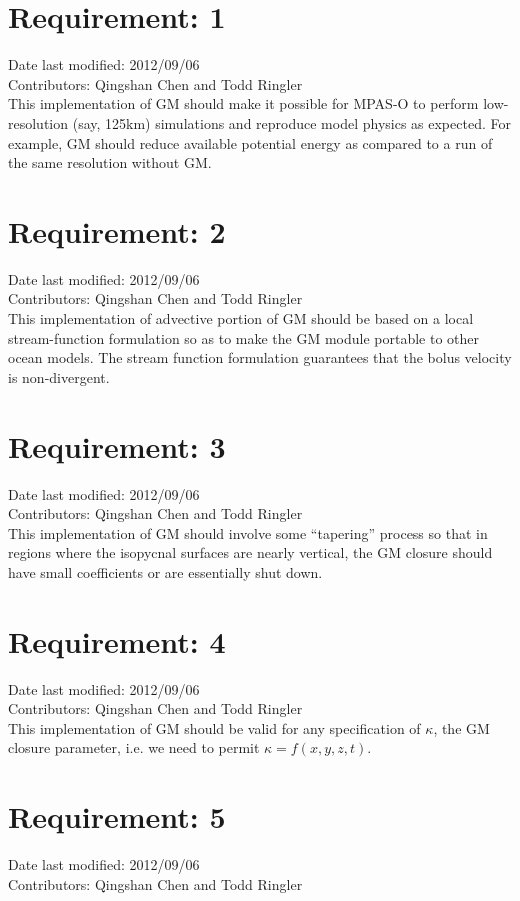 \documentclass[12pt]{report}
\begin{document}
\section{Requirement: 1}
Date last modified: 2012/09/06 \\
Contributors: Qingshan Chen and Todd Ringler\\

This implementation of GM should make it possible for MPAS-O to
perform low-resolution (say, 125km) simulations and reproduce model
physics as expected. For example, GM should reduce available potential energy as compared to a run of the same resolution without GM.

\section{Requirement: 2}
Date last modified: 2012/09/06 \\
Contributors: Qingshan Chen and Todd Ringler\\

This implementation of advective portion of GM should be based on a local stream-function formulation so as to make the GM module portable to other ocean models. The stream function formulation guarantees that the bolus velocity is non-divergent.


\section{Requirement: 3}
Date last modified: 2012/09/06 \\
Contributors: Qingshan Chen and Todd Ringler\\

This implementation of GM should involve some ``tapering'' process so
that in regions where the isopycnal surfaces are nearly vertical, the
GM closure should have small coefficients or are essentially shut down.

\section{Requirement: 4}
Date last modified: 2012/09/06 \\
Contributors: Qingshan Chen and Todd Ringler\\

This implementation of GM should be valid for any specification of $\kappa$, the GM closure parameter, i.e. we need to permit $\kappa=f(x,y,z,t)$.

\section{Requirement: 5}
Date last modified: 2012/09/06 \\
Contributors: Qingshan Chen and Todd Ringler\\
\end{document}
